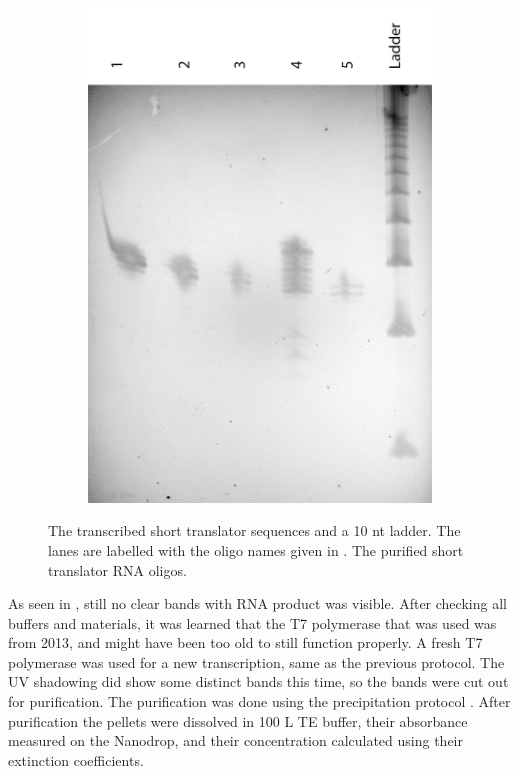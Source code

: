 \begin{figure}[h]
\begin{subfigure}[t]{.55\textwidth}
  \includegraphics[width=\textwidth]{images/translator_transcription_purified.png}
  \caption{}
  \label{translator_transcription_purified}
\end{subfigure}
\caption{ The transcribed short translator sequences and a 10 nt ladder. The lanes are labelled with the oligo names given in .  The purified short translator RNA oligos.}
\end{figure}

As seen in , still no clear bands with RNA product was visible. After checking all buffers and materials, it was learned that the T7 polymerase that was used was from 2013, and might have been too old to still function properly. A fresh T7 polymerase was used for a new transcription, same as the previous protocol. The UV shadowing did show some distinct bands this time, so the bands were cut out for purification. The purification was done using the precipitation protocol \cite{precipitationprotocol}. After purification the pellets were dissolved in 100 \si{\micro}L TE buffer, their absorbance measured on the Nanodrop, and their concentration calculated using their extinction coefficients.

